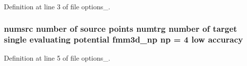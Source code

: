 Definition at line 3 of file options\_.
\subsubsection{\setlength{\rightskip}{0pt plus 5cm}numsrc number of source points numtrg number of target single evaluating potential fmm3d\_\-np {\bf np} = 4 low accuracy}\label{options__0_cf3fc916339b02ad9c14aca2425ccf53_cf3fc916339b02ad9c14aca2425ccf53}




Definition at line 5 of file options\_.